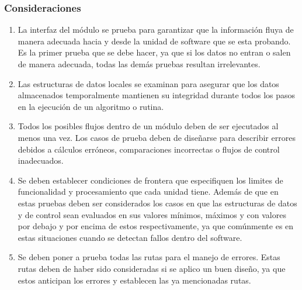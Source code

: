 \subsubsection{Consideraciones}
\begin{enumerate}
	\item La interfaz del módulo se prueba para garantizar que la información fluya de manera adecuada hacia y desde la unidad de software que se esta probando. Es la primer prueba que se debe hacer, ya que si los datos no entran o salen de manera adecuada, todas las demás pruebas resultan irrelevantes.
	\item Las estructuras de datos locales se examinan para asegurar que los datos almacenados temporalmente mantienen su integridad durante todos los pasos en la ejecución de un algoritmo o rutina.
	\item Todos los posibles flujos dentro de un módulo deben de ser ejecutados al menos una vez. Los casos de prueba deben de diseñarse para describir errores debidos a cálculos erróneos, comparaciones incorrectas o flujos de control inadecuados.
	\item Se deben establecer condiciones de frontera que especifiquen los limites de funcionalidad y procesamiento que cada unidad tiene.  Además de que en estas pruebas deben ser considerados los casos en que las estructuras de datos y de control sean evaluados en sus valores mínimos, máximos y con valores por debajo y por encima de estos respectivamente, ya que comúnmente es en estas situaciones cuando se detectan fallos dentro del software.
	\item Se deben poner a prueba todas las rutas para el manejo de errores. Estas rutas deben de haber sido consideradas si se aplico un buen diseño, ya que estos anticipan los errores y establecen las ya mencionadas rutas.
\end{enumerate}
